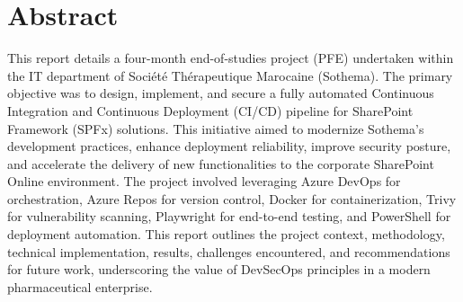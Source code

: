\chapter*{Abstract}
\normalsize{
This report details a four-month end-of-studies project (PFE) undertaken within the IT department of Société Thérapeutique Marocaine (Sothema). The primary objective was to design, implement, and secure a fully automated Continuous Integration and Continuous Deployment (CI/CD) pipeline for SharePoint Framework (SPFx) solutions. This initiative aimed to modernize Sothema's development practices, enhance deployment reliability, improve security posture, and accelerate the delivery of new functionalities to the corporate SharePoint Online environment. The project involved leveraging Azure DevOps for orchestration, Azure Repos for version control, Docker for containerization, Trivy for vulnerability scanning, Playwright for end-to-end testing, and PowerShell for deployment automation. This report outlines the project context, methodology, technical implementation, results, challenges encountered, and recommendations for future work, underscoring the value of DevSecOps principles in a modern pharmaceutical enterprise.
}
